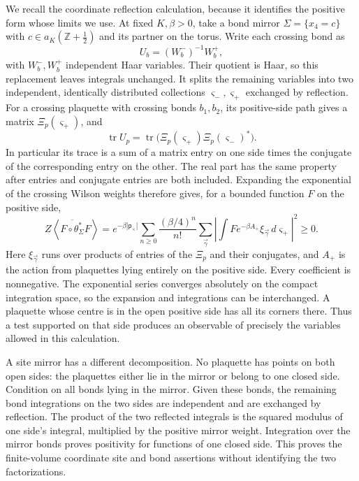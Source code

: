 \documentclass[11pt,letterpaper,reqno]{amsart}
\theoremstyle{definition}
\theoremstyle{remark}
\newcommand{\tr}{\operatorname{tr}}
\begin{document}
We recall the coordinate reflection calculation, because it identifies
the positive form whose limits we use. At fixed $K,\beta>0$, take a
bond mirror $\Sigma=\{x_4=c\}$ with
$c\in a_K(\mathbb Z+\tfrac12)$ and its partner on the torus. Write
each crossing bond as
\[
 U_b=(W_b^-)^{-1}W_b^+,
\]
with $W_b^-,W_b^+$ independent Haar variables. Their quotient is Haar,
so this replacement leaves integrals unchanged. It splits the remaining
variables into two independent, identically distributed collections
$\varsigma_-,\varsigma_+$ exchanged by reflection. For a crossing
plaquette with crossing bonds $b_1,b_2$, its positive-side path gives
a matrix $\Xi_p(\varsigma_+)$, and
\[
 \tr U_p=\tr\big(\Xi_p(\varsigma_+)
                                  \Xi_p(\varsigma_-)^*\big).
\]
In particular its trace is a sum of a matrix entry on one side times
the conjugate of the corresponding entry on the other. The real part
has the same property after entries and conjugate entries are both
included. Expanding the exponential of the crossing Wilson weights
therefore gives, for a bounded function $F$ on the positive side,
\begin{equation}\label{eq:coordinate-rp-expansion}
 Z\left\langle\overline{F\circ\theta_\Sigma^*}F\right\rangle
 =e^{-\beta|\mathsf p_\times|}
   \sum_{n\ge0}\frac{(\beta/4)^n}{n!}
       \sum_{\vec\gamma}
       \left|\int F e^{-\beta A_+}
                         \xi_{\vec\gamma}\,d\varsigma_+\right|^2
 \ge0.
\end{equation}
Here $\xi_{\vec\gamma}$ runs over products of entries of the
$\Xi_p$ and their conjugates, and $A_+$ is the action from plaquettes
lying entirely on the positive side. Every coefficient is nonnegative.
The exponential series converges absolutely on the compact integration
space, so the expansion and integrations can be interchanged. A
plaquette whose centre is in the open positive side has all its corners
there. Thus a test supported on that side produces an observable of
precisely the variables allowed in this calculation.

A site mirror has a different decomposition. No plaquette has points
on both open sides: the plaquettes either lie in the mirror or belong
to one closed side. Condition on all bonds lying in the mirror.
Given these bonds, the remaining bond integrations on the two sides
are independent and are exchanged by reflection. The product of
the two reflected integrals is the squared modulus of one side's
integral, multiplied by the positive mirror weight. Integration over
the mirror bonds proves positivity for functions of one closed side.
This proves the finite-volume coordinate site and bond assertions
without identifying the two factorizations.
\end{document}
